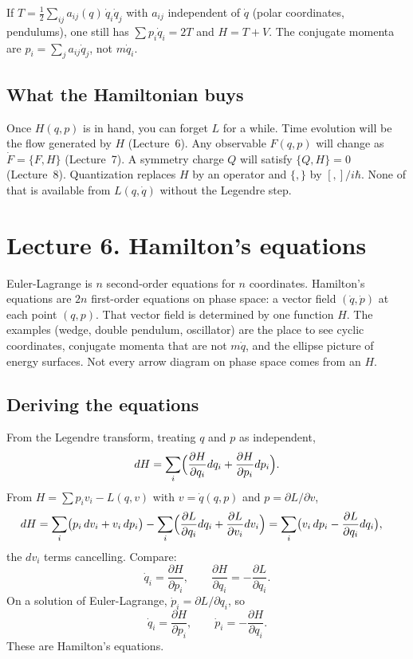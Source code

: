 \documentclass[11pt]{article}
\numberwithin{equation}{section}
\newcommand{\qdot}{\dot{q}}
\newcommand{\pdot}{\dot{p}}
\newcommand{\pd}[2]{\frac{\partial #1}{\partial #2}}
\begin{document}
If $T=\tfrac12\sum_{ij}a_{ij}(q)\,\qdot_i\qdot_j$ with $a_{ij}$ independent of $\qdot$ (polar coordinates, pendulums), one still has $\sum p_i\qdot_i=2T$ and $H=T+V$. The conjugate momenta are $p_i=\sum_j a_{ij}\qdot_j$, not $m\qdot_i$.

\subsection{What the Hamiltonian buys}

Once $H(q,p)$ is in hand, you can forget $L$ for a while. Time evolution will be the flow generated by $H$ (Lecture~6). Any observable $F(q,p)$ will change as $\dot F=\{F,H\}$ (Lecture~7). A symmetry charge $Q$ will satisfy $\{Q,H\}=0$ (Lecture~8). Quantization replaces $H$ by an operator and $\{,\}$ by $[,]/i\hbar$. None of that is available from $L(q,\qdot)$ without the Legendre step.

\section{Lecture 6. Hamilton's equations}

Euler-Lagrange is $n$ second-order equations for $n$ coordinates. Hamilton's equations are $2n$ first-order equations on phase space: a vector field $(\qdot,\pdot)$ at each point $(q,p)$. That vector field is determined by one function $H$. The examples (wedge, double pendulum, oscillator) are the place to see cyclic coordinates, conjugate momenta that are not $m\qdot$, and the ellipse picture of energy surfaces. Not every arrow diagram on phase space comes from an $H$.

\subsection{Deriving the equations}

From the Legendre transform, treating $q$ and $p$ as independent,
\[
dH = \sum_i\Bigl(\pd{H}{q_i}dq_i + \pd{H}{p_i}dp_i\Bigr).
\]
From $H=\sum p_i v_i - L(q,v)$ with $v=\qdot(q,p)$ and $p=\partial L/\partial v$,
\begin{align*}
dH
&= \sum_i\bigl(p_i\,dv_i + v_i\,dp_i\bigr)
- \sum_i\Bigl(\pd{L}{q_i}dq_i + \pd{L}{v_i}dv_i\Bigr)
= \sum_i\bigl(v_i\,dp_i - \pd{L}{q_i}dq_i\bigr),
\end{align*}
the $dv_i$ terms cancelling. Compare:
\begin{equation}
\label{eq:Ham}
\qdot_i = \pd{H}{p_i},\qquad
\pd{H}{q_i} = -\pd{L}{q_i}.
\end{equation}
On a solution of Euler-Lagrange, $\dot p_i=\partial L/\partial q_i$, so
\begin{equation}
\label{eq:Hameom}
\qdot_i = \pd{H}{p_i},\qquad
\pdot_i = -\pd{H}{q_i}.
\end{equation}
These are Hamilton's equations.
\end{document}
